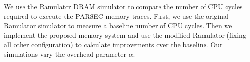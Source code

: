 We use the Ramulator DRAM simulator to compare the number of CPU cycles required to execute the PARSEC memory traces. First, we use the original Ramulator simulator to measure a baseline number of CPU cycles. Then we implement the proposed memory system and use the modified Ramulator (fixing all other configuration) to calculate improvements over the baseline. Our simulations vary the overhead parameter $\alpha$.

%
